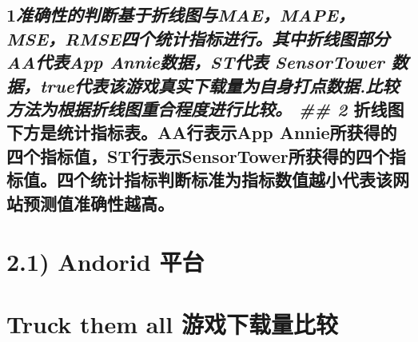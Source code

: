 \documentclass[11pt]{article}
\begin{document}
\subsection{\texorpdfstring{1\emph{准确性的判断基于折线图与MAE，MAPE，MSE，RMSE四个统计指标进行。其中折线图部分AA代表App
Annie数据，ST代表 SensorTower
数据，true代表该游戏真实下载量为自身打点数据.比较方法为根据折线图重合程度进行比较。
\#\# 2} 折线图下方是统计指标表。AA行表示App
Annie所获得的四个指标值，ST行表示SensorTower所获得的四个指标值。四个统计指标判断标准为指标数值越小代表该网站预测值准确性越高。}{1准确性的判断基于折线图与MAE，MAPE，MSE，RMSE四个统计指标进行。其中折线图部分AA代表App Annie数据，ST代表 SensorTower 数据，true代表该游戏真实下载量为自身打点数据.比较方法为根据折线图重合程度进行比较。 \#\# 2 折线图下方是统计指标表。AA行表示App Annie所获得的四个指标值，ST行表示SensorTower所获得的四个指标值。四个统计指标判断标准为指标数值越小代表该网站预测值准确性越高。}}\label{ux51c6ux786eux6027ux7684ux5224ux65adux57faux4e8eux6298ux7ebfux56feux4e0emaemapemsermseux56dbux4e2aux7edfux8ba1ux6307ux6807ux8fdbux884cux5176ux4e2dux6298ux7ebfux56feux90e8ux5206aaux4ee3ux8868app-annieux6570ux636estux4ee3ux8868-sensortower-ux6570ux636etrueux4ee3ux8868ux8be5ux6e38ux620fux771fux5b9eux4e0bux8f7dux91cfux4e3aux81eaux8eabux6253ux70b9ux6570ux636e.ux6bd4ux8f83ux65b9ux6cd5ux4e3aux6839ux636eux6298ux7ebfux56feux91cdux5408ux7a0bux5ea6ux8fdbux884cux6bd4ux8f83-2-ux6298ux7ebfux56feux4e0bux65b9ux662fux7edfux8ba1ux6307ux6807ux8868aaux884cux8868ux793aapp-annieux6240ux83b7ux5f97ux7684ux56dbux4e2aux6307ux6807ux503cstux884cux8868ux793asensortowerux6240ux83b7ux5f97ux7684ux56dbux4e2aux6307ux6807ux503cux56dbux4e2aux7edfux8ba1ux6307ux6807ux5224ux65adux6807ux51c6ux4e3aux6307ux6807ux6570ux503cux8d8aux5c0fux4ee3ux8868ux8be5ux7f51ux7ad9ux9884ux6d4bux503cux51c6ux786eux6027ux8d8aux9ad8}

    \section{2.1) Andorid 平台}\label{andorid-ux5e73ux53f0}

\section{Truck them all
游戏下载量比较}\label{truck-them-all-ux6e38ux620fux4e0bux8f7dux91cfux6bd4ux8f83}
\end{document}
